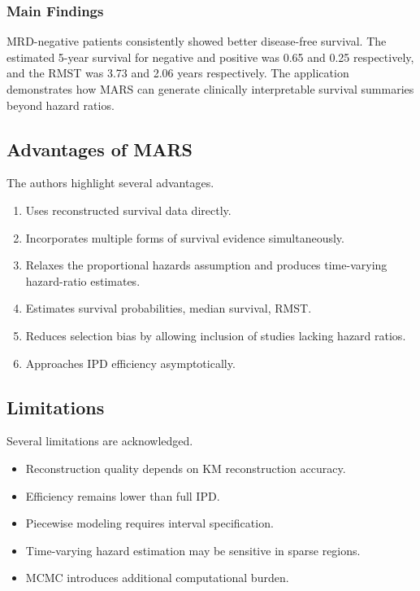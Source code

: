 \documentclass[11pt]{article}
\begin{document}
\subsubsection*{Main Findings}

MRD-negative patients consistently showed better disease-free survival. The estimated 5-year survival for negative and positive was 0.65 and 0.25 respectively, and the RMST was 3.73 and 2.06 years respectively. The application demonstrates how MARS can generate clinically interpretable survival summaries beyond hazard ratios.

\subsection*{Advantages of MARS}

The authors highlight several advantages.

\begin{enumerate}
    \item Uses reconstructed survival data directly.
    \item Incorporates multiple forms of survival evidence simultaneously.
    \item Relaxes the proportional hazards assumption and produces time-varying hazard-ratio estimates.
    \item Estimates survival probabilities, median survival, RMST.
    \item Reduces selection bias by allowing inclusion of studies lacking hazard ratios.
    \item Approaches IPD efficiency asymptotically.
\end{enumerate}

\subsection*{Limitations}

Several limitations are acknowledged.

\begin{itemize}
    \item Reconstruction quality depends on KM reconstruction accuracy.
    \item Efficiency remains lower than full IPD.
    \item Piecewise modeling requires interval specification.
    \item Time-varying hazard estimation may be sensitive in sparse regions.
    \item MCMC introduces additional computational burden.
\end{itemize}
\end{document}
